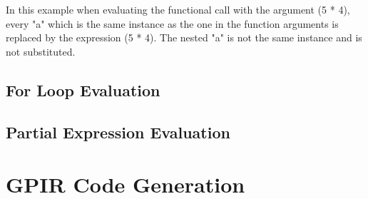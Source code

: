 In this example when evaluating the functional call with the argument (5 * 4),
every "a" which is the same instance as the one in the function arguments
is replaced by the expression (5 * 4). The nested "a" is not the same
instance and is not substituted.



\subsection{For Loop Evaluation}

\subsection{Partial Expression Evaluation}


\section{GPIR Code Generation}





